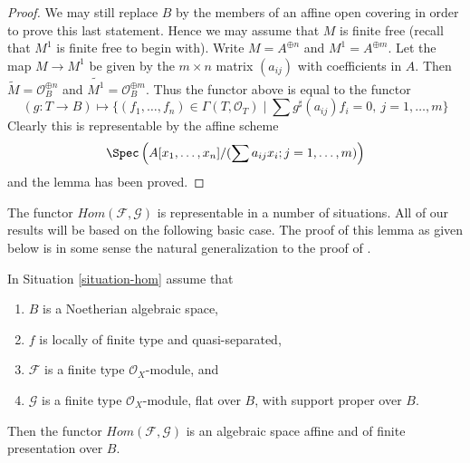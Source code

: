 \begin{proof}
\medskip\noindent
We may still replace $B$ by the members of an affine open covering
in order to prove this last statement. Hence we may assume that $M$
is finite free (recall that $M^1$ is finite free to begin with).
Write $M = A^{\oplus n}$ and $M^1 = A^{\oplus m}$. Let the map
$M \to M^1$ be given by the $m \times n$ matrix $(a_{ij})$ with
coefficients in $A$. Then $\widetilde{M} = \mathcal{O}_B^{\oplus n}$
and $\widetilde{M^1} = \mathcal{O}_B^{\oplus m}$. Thus the functor
above is equal to the functor
$$
(g : T \to B) \longmapsto
\{(f_1, \ldots, f_n) \in \Gamma(T, \mathcal{O}_T) \mid
\sum g^\sharp(a_{ij})f_i = 0,\ j = 1, \ldots, m\}
$$
Clearly this is representable by the affine scheme
$$
\Spec\left(A[x_1, \ldots, x_n]/(\sum a_{ij}x_i; j = 1, \ldots, m)\right)
$$
and the lemma has been proved.
\end{proof}

\noindent
The functor $\mathit{Hom}(\mathcal{F}, \mathcal{G})$ is representable in a
number of situations. All of our results will be based on the following
basic case. The proof of this lemma as given below is in some sense the
natural generalization to the proof of \cite[III, Cor 7.7.8]{EGA}.

\begin{lemma}
\label{lemma-noetherian-hom}
In Situation \ref{situation-hom} assume that
\begin{enumerate}
\item $B$ is a Noetherian algebraic space,
\item $f$ is locally of finite type and quasi-separated,
\item $\mathcal{F}$ is a finite type $\mathcal{O}_X$-module, and
\item $\mathcal{G}$ is a finite type $\mathcal{O}_X$-module, flat over $B$,
with support proper over $B$.
\end{enumerate}
Then the functor $\mathit{Hom}(\mathcal{F}, \mathcal{G})$ is
an algebraic space affine and of finite presentation over $B$.
\end{lemma}

